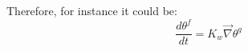Therefore, for instance it could be:
\begin{equation}
\frac{d \theta^f}{dt} = K_w \vec{\nabla}{\theta^g}
\end{equation}
